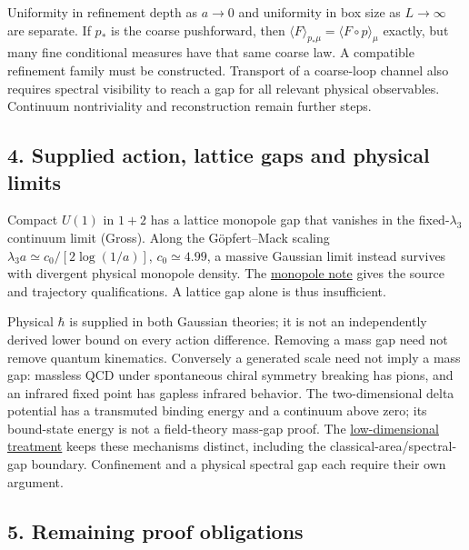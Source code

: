 \documentclass[11pt,a4paper]{article}
\begin{document}
Uniformity in refinement depth as \(a\to0\) and uniformity in box size
as \(L\to\infty\) are separate. If \(p_*\) is the coarse pushforward,
then \(\langle F\rangle_{p_*\mu}=\langle F\circ p\rangle_\mu\) exactly,
but many fine conditional measures have that same coarse law. A
compatible refinement family must be constructed. Transport of a
coarse-loop channel also requires spectral visibility to reach a gap for
all relevant physical observables. Continuum nontriviality and
reconstruction remain further steps.

\hypertarget{supplied-action-lattice-gaps-and-physical-limits}{%
\subsection{4. Supplied action, lattice gaps and physical
limits}\label{supplied-action-lattice-gaps-and-physical-limits}}

Compact \(U(1)\) in \(1+2\) has a lattice monopole gap that vanishes in
the fixed-\(\lambda_3\) continuum limit (Gross). Along the Göpfert--Mack
scaling \(\lambda_3a\simeq c_0/[2\log(1/a)]\), \(c_0\simeq4.99\), a
massive Gaussian limit instead survives with divergent physical monopole
density. The \href{villain-monopole-refinement.md}{monopole note} gives
the source and trajectory qualifications. A lattice gap alone is thus
insufficient.

Physical \(\hbar\) is supplied in both Gaussian theories; it is not an
independently derived lower bound on every action difference. Removing a
mass gap need not remove quantum kinematics. Conversely a generated
scale need not imply a mass gap: massless QCD under spontaneous chiral
symmetry breaking has pions, and an infrared fixed point has gapless
infrared behavior. The two-dimensional delta potential has a transmuted
binding energy and a continuum above zero; its bound-state energy is not
a field-theory mass-gap proof. The
\href{low-dimensional-mass-gap.md}{low-dimensional treatment} keeps
these mechanisms distinct, including the classical-area/spectral-gap
boundary. Confinement and a physical spectral gap each require their own
argument.

\hypertarget{remaining-proof-obligations}{%
\subsection{5. Remaining proof
obligations}\label{remaining-proof-obligations}}
\end{document}
